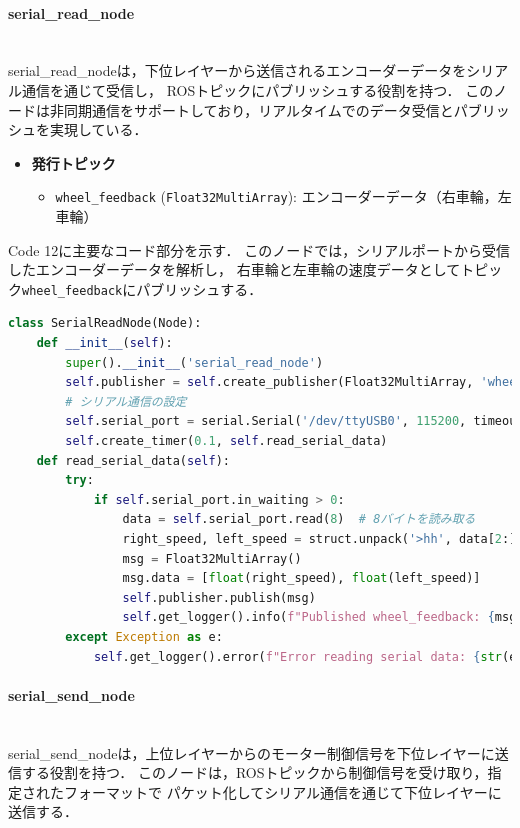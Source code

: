 \newpage


\paragraph{serial\_read\_node}\mbox{}\\
serial\_read\_nodeは，下位レイヤーから送信されるエンコーダーデータをシリアル通信を通じて受信し，
ROSトピックにパブリッシュする役割を持つ．
このノードは非同期通信をサポートしており，リアルタイムでのデータ受信とパブリッシュを実現している．

\begin{itemize}
    \item \textbf{発行トピック}
          \begin{itemize}
              \item \texttt{wheel\_feedback} (\texttt{Float32MultiArray}): エンコーダーデータ（右車輪，左車輪）
          \end{itemize}
\end{itemize}

Code 12に主要なコード部分を示す．
このノードでは，シリアルポートから受信したエンコーダーデータを解析し，
右車輪と左車輪の速度データとしてトピック\texttt{wheel\_feedback}にパブリッシュする．

\begin{lstlisting}[language=Python, caption=シリアルデータの受信とトピックへのパブリッシュ (serial\_read\_node.py)]
class SerialReadNode(Node):
    def __init__(self):
        super().__init__('serial_read_node')
        self.publisher = self.create_publisher(Float32MultiArray, 'wheel_feedback', 10)
        # シリアル通信の設定
        self.serial_port = serial.Serial('/dev/ttyUSB0', 115200, timeout=1)
        self.create_timer(0.1, self.read_serial_data)
    def read_serial_data(self):
        try:
            if self.serial_port.in_waiting > 0:
                data = self.serial_port.read(8)  # 8バイトを読み取る
                right_speed, left_speed = struct.unpack('>hh', data[2:])  # データのデコード
                msg = Float32MultiArray()
                msg.data = [float(right_speed), float(left_speed)]
                self.publisher.publish(msg)
                self.get_logger().info(f"Published wheel_feedback: {msg.data}")
        except Exception as e:
            self.get_logger().error(f"Error reading serial data: {str(e)}")
\end{lstlisting}

\paragraph{serial\_send\_node}\mbox{}\\
serial\_send\_nodeは，上位レイヤーからのモーター制御信号を下位レイヤーに送信する役割を持つ．
このノードは，ROSトピックから制御信号を受け取り，指定されたフォーマットで
パケット化してシリアル通信を通じて下位レイヤーに送信する．

